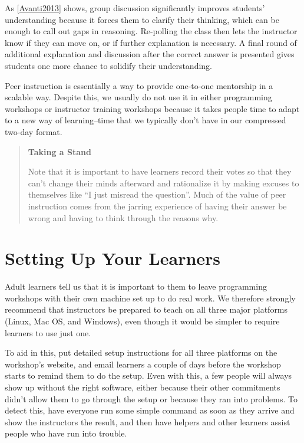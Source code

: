 \documentclass[10pt,statementpaper]{memoir}
\begin{document}
As {[}\href{biblio.html\#video-peer-instruction}{Avanti2013}{]} shows,
group discussion significantly improves students' understanding because
it forces them to clarify their thinking, which can be enough to call
out gaps in reasoning. Re-polling the class then lets the instructor
know if they can move on, or if further explanation is necessary. A
final round of additional explanation and discussion after the correct
answer is presented gives students one more chance to solidify their
understanding.

Peer instruction is essentially a way to provide one-to-one mentorship
in a scalable way. Despite this, we usually do not use it in either
programming workshops or instructor training workshops because it takes
people time to adapt to a new way of learning--time that we typically
don't have in our compressed two-day format.

\begin{quote}
\textbf{Taking a Stand}

Note that it is important to have learners record their votes so that
they can't change their minds afterward and rationalize it by making
excuses to themselves like ``I just misread the question''. Much of the
value of peer instruction comes from the jarring experience of having
their answer be wrong and having to think through the reasons why.
\end{quote}

\section{Setting Up Your Learners}\label{setting-up-your-learners}

Adult learners tell us that it is important to them to leave programming
workshops with their own machine set up to do real work. We therefore
strongly recommend that instructors be prepared to teach on all three
major platforms (Linux, Mac OS, and Windows), even though it would be
simpler to require learners to use just one.

To aid in this, put detailed setup instructions for all three platforms
on the workshop's website, and email learners a couple of days before
the workshop starts to remind them to do the setup. Even with this, a
few people will always show up without the right software, either
because their other commitments didn't allow them to go through the
setup or because they ran into problems. To detect this, have everyone
run some simple command as soon as they arrive and show the instructors
the result, and then have helpers and other learners assist people who
have run into trouble.
\end{document}
